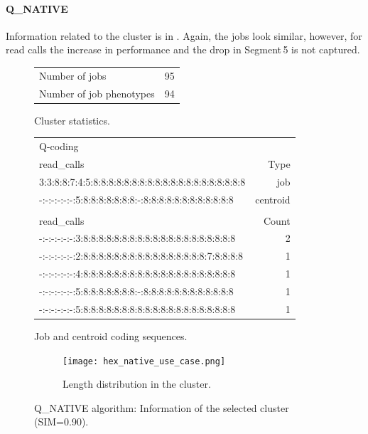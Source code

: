 \documentclass{jhps}
\begin{document}
\FloatBarrier
\paragraph{Q\_NATIVE}
Information related to the cluster is in .
Again, the jobs look similar, however, for read calls the increase in performance and the drop in Segment\,5 is not captured.

\begin{figure}
	\begin{subtable}{\textwidth}
		\centering
		\begin{tabular}{ll}
			Number of jobs & 95 \\
			Number of job phenotypes & 94 \\
		\end{tabular}
		\caption{Cluster statistics.}
		\label{cluster:use_case:hex_native:stats}
	\end{subtable}
	\medskip
	\begin{subtable}{\textwidth}
		\centering
		\begin{tiny}
      \begin{tabular}{l|r}
        \rowcolor{tblhead}
        Q-coding & \\
        \rowcolor{tblhead}
        read\_calls                                             &  Type     \\ 
        \hline
        3:3:8:8:7:4:5:8:8:8:8:8:8:8:8:8:8:8:8:8:8:8:8:8:8:8:8   &  job      \\ 
        -:-:-:-:-:-:5:8:8:8:8:8:8:8:-:8:8:8:8:8:8:8:8:8:8:8:8   &  centroid \\ 
        \multicolumn{2}{l}{}                                    \\ 
        \rowcolor{tblhead}
        read\_calls                                             &  Count    \\ 
        \hline
        -:-:-:-:-:-:3:8:8:8:8:8:8:8:8:8:8:8:8:8:8:8:8:8:8:8:8   &  2        \\ 
        -:-:-:-:-:-:2:8:8:8:8:8:8:8:8:8:8:8:8:8:8:8:8:7:8:8:8:8 &  1        \\ 
        -:-:-:-:-:-:4:8:8:8:8:8:8:8:8:8:8:8:8:8:8:8:8:8:8:8:8   &  1        \\ 
        -:-:-:-:-:-:5:8:8:8:8:8:8:8:-:8:8:8:8:8:8:8:8:8:8:8:8   &  1        \\ 
        -:-:-:-:-:-:5:8:8:8:8:8:8:8:8:8:8:8:8:8:8:8:8:8:8:8:8   &  1        \\ 
      \end{tabular}
		\end{tiny}
		\caption{Job and centroid coding sequences.}
		\label{cluster:use_case:hex_native:job_centroid}
	\end{subtable}
	\medskip
	\begin{subfigure}{\textwidth}
		\centering
		\texttt{[image: hex\_native\_use\_case.png]}
		\caption{Length distribution in the cluster.}
		\label{cluster:use_case:hex_native:length}
	\end{subfigure}
	\caption{Q\_NATIVE algorithm: Information of the selected cluster (SIM=0.90).}
	\label{cluster:use_case:hex_native}
\end{figure}
\end{document}
